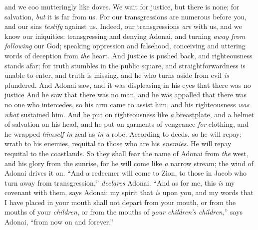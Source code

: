 \begin{biblechapter}
and we coo mutteringly like doves. 
We wait for justice, but there is none; 
for salvation, \textit{but} it is far from us.
\verse For our transgressions are numerous before you, 
and our sins \textit{testify} against us. 
Indeed, our transgressions \textit{are} with us, 
and we know our iniquities:
\verse transgressing and denying Adonai, 
and turning \textit{away from following} our God; 
speaking oppression and falsehood, 
conceiving and uttering words of deception from \textit{the} heart.
\verse And justice is pushed back, 
and righteousness stands afar; 
for truth stumbles in the public square, 
and straightforwardness is unable to enter,
\verse and truth is missing, 
and he who turns aside from evil \textit{is} plundered. 
And Adonai saw, 
and it was displeasing in his eyes that there was no justice
\verse And he saw that there was no man, 
and he was appalled that there was no one who intercedes, 
so his arm came to assist him, 
and his righteousness \textit{was what} sustained him.
\verse And he put on righteousness like \textit{a} breastplate, 
and a helmet of salvation on his head, 
and he put on garments of vengeance \textit{for} clothing, 
and he wrapped \textit{himself in} zeal as \textit{in a} robe.
\verse According to deeds, so he will repay; 
wrath to his enemies, requital to those who are his \textit{enemies}. 
He will repay requital to the coastlands.
\verse So they shall fear the name of Adonai from \textit{the} west, 
and his glory from the sunrise, 
for he will come like \textit{a} narrow stream; 
the wind of Adonai drives it on.
\verse “And a redeemer will come to Zion, 
to those in Jacob who turn away from transgression,” \textit{declares} Adonai.
\verse “And as for me, this \textit{is} my covenant with them, says Adonai: my spirit that \textit{is} upon you, 
and my words that I have placed in your mouth 
shall not depart from your mouth, 
or from the mouths of your \textit{children}, 
or from the mouths of \textit{your children’s children},” 
says Adonai, “from now on and forever.”
\end{biblechapter}

